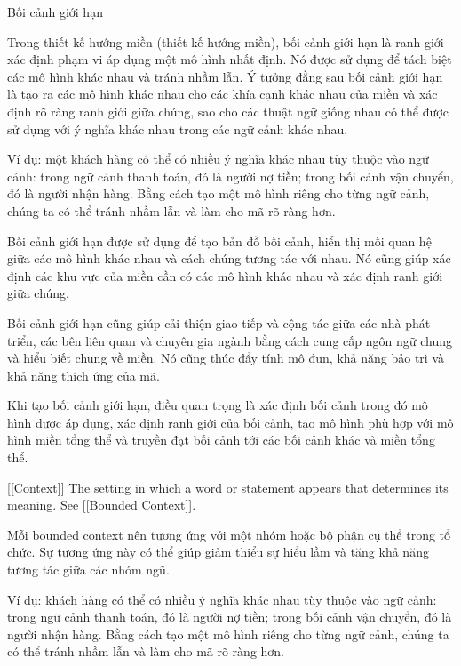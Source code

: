 Bối cảnh giới hạn

Trong thiết kế hướng miền (thiết kế hướng miền), bối cảnh giới hạn là ranh giới xác định phạm vi áp dụng một mô hình nhất định. Nó được sử dụng để tách biệt các mô hình khác nhau và tránh nhầm lẫn. Ý tưởng đằng sau bối cảnh giới hạn là tạo ra các mô hình khác nhau cho các khía cạnh khác nhau của miền và xác định rõ ràng ranh giới giữa chúng, sao cho các thuật ngữ giống nhau có thể được sử dụng với ý nghĩa khác nhau trong các ngữ cảnh khác nhau.

Ví dụ: một khách hàng có thể có nhiều ý nghĩa khác nhau tùy thuộc vào ngữ cảnh: trong ngữ cảnh thanh toán, đó là người nợ tiền; trong bối cảnh vận chuyển, đó là người nhận hàng. Bằng cách tạo một mô hình riêng cho từng ngữ cảnh, chúng ta có thể tránh nhầm lẫn và làm cho mã rõ ràng hơn.

Bối cảnh giới hạn được sử dụng để tạo bản đồ bối cảnh, hiển thị mối quan hệ giữa các mô hình khác nhau và cách chúng tương tác với nhau. Nó cũng giúp xác định các khu vực của miền cần có các mô hình khác nhau và xác định ranh giới giữa chúng.

Bối cảnh giới hạn cũng giúp cải thiện giao tiếp và cộng tác giữa các nhà phát triển, các bên liên quan và chuyên gia ngành bằng cách cung cấp ngôn ngữ chung và hiểu biết chung về miền. Nó cũng thúc đẩy tính mô đun, khả năng bảo trì và khả năng thích ứng của mã.

Khi tạo bối cảnh giới hạn, điều quan trọng là xác định bối cảnh trong đó mô hình được áp dụng, xác định ranh giới của bối cảnh, tạo mô hình phù hợp với mô hình miền tổng thể và truyền đạt bối cảnh tới các bối cảnh khác và miền tổng thể.



[[Context]] The setting in which a word or statement appears that determines its meaning. See [[Bounded Context]].

Mỗi bounded context nên tương ứng với một nhóm hoặc bộ phận cụ thể trong tổ chức. Sự tương ứng này có thể giúp giảm thiểu sự hiểu lầm và tăng khả năng tương tác giữa các nhóm ngũ.

Ví dụ: khách hàng có thể có nhiều ý nghĩa khác nhau tùy thuộc vào ngữ cảnh: trong ngữ cảnh thanh toán, đó là người nợ tiền; trong bối cảnh vận chuyển, đó là người nhận hàng. Bằng cách tạo một mô hình riêng cho từng ngữ cảnh, chúng ta có thể tránh nhầm lẫn và làm cho mã rõ ràng hơn.

